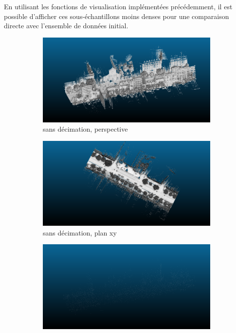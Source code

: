 \documentclass[../5RO17_TP4.tex]{subfiles}
\begin{document}
\noindent En utilisant les fonctions de visualisation implémentées précédemment, il est possible d’afficher ces sous-échantillons moins denses pour une comparaison directe avec l'ensemble de données initial.
\begin{figure}[H]
    \centering
    \begin{subfigure}[b]{0.475\textwidth}
        \centering
        \includegraphics[width=\linewidth]{images/ndc_7.png}
        \caption{sans décimation, perspective}
        \label{}
    \end{subfigure}\hfill
    \begin{subfigure}[b]{0.475\textwidth}
        \centering
        \includegraphics[width=\linewidth]{images/ndc_8.png}
        \caption{sans décimation, plan xy}
        \label{}
    \end{subfigure}\hfill
        \begin{subfigure}[b]{0.475\textwidth}
        \centering
        \includegraphics[width=\linewidth]{images/ndc_1000_7.png}

\end{subfigure}
\end{figure}
\end{document}
